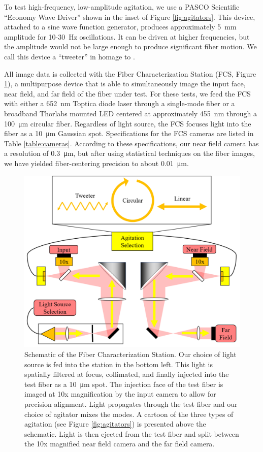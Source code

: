 \documentclass[twocolumn]{emulateapj}
\begin{document}
To test high-frequency, low-amplitude agitation, we use a PASCO Scientific ``Economy Wave Driver'' shown in the inset of Figure \ref{fig:agitators}. This device, attached to a sine wave function generator, produces approximately \SI{5}{\milli\meter} amplitude for 10-\SI{30}{\hertz} oscillations. It can be driven at higher frequencies, but the amplitude would not be large enough to produce significant fiber motion. We call this device a ``tweeter'' in homage to \citet{Plavchan2013}.

All image data is collected with the Fiber Characterization Station (FCS, Figure \ref{fig:fcs}), a multipurpose device that is able to simultaneously image the input face, near field, and far field of the fiber under test. For these tests, we feed the FCS with either a \SI{652}{\nano\meter} Toptica diode laser through a single-mode fiber or a broadband Thorlabs mounted LED centered at approximately \SI{455}{\nano\meter} through a \SI{100}{\micro\meter} circular fiber. Regardless of light source, the FCS focuses light into the fiber as a \SI{10}{\micro\meter} Gaussian spot. Specifications for the FCS cameras are listed in Table \ref{table:cameras}. According to these specifications, our near field camera has a resolution of \SI{0.3}{\micro\meter}, but after using statistical techniques on the fiber images, we have yielded fiber-centering precision to about \SI{0.01}{\micro\meter}. 

\begin{figure}
\centering
	\includegraphics[width=\columnwidth]{images/fcs_schematic.pdf}
	\caption{Schematic of the Fiber Characterization Station. Our choice of light source is fed into the station in the bottom left. This light is spatially filtered at focus, collimated, and finally injected into the test fiber as a \SI{10}{\micro\meter} spot. The injection face of the test fiber is imaged at 10x magnification by the input camera to allow for precision alignment. Light propagates through the test fiber and our choice of agitator mixes the modes. A cartoon of the three types of agitation (see Figure \ref{fig:agitators}) is presented above the schematic. Light is then ejected from the test fiber and split between the 10x magnified near field camera and the far field camera.}
\label{fig:fcs}
\end{figure}
\end{document}
